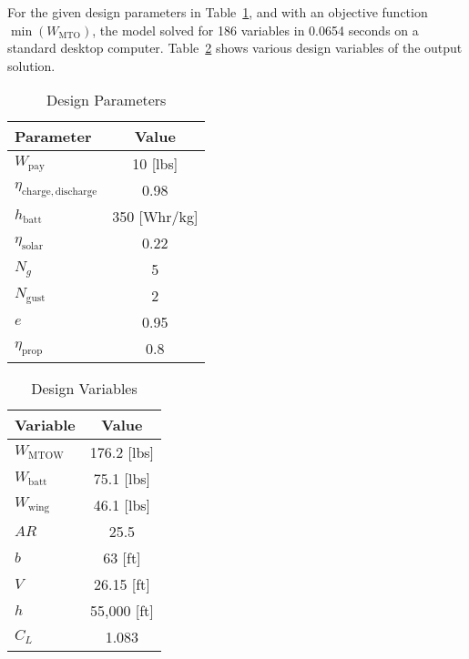 \documentclass[]{aiaa-tc}%
\begin{document}
    For the given design parameters in Table~\ref{t:params}, and with an objective function $\min(W_{\mathrm{MTO}})$, the model solved for 186 variables in 0.0654 seconds on a standard desktop computer. 
Table~\ref{t:design} shows various design variables of the output solution. 

\begin{multicols}{2}

\begin{table}[H]
    \centering
    \caption{Design Parameters}
    \label{t:params}
    \begin{tabular}{l c}
    \toprule
    \toprule
    Parameter                                   & Value \\ \hline
    $W_{\mathrm{pay}}$                          & 10 [lbs] \\
    $\eta_{\mathrm{charge, discharge}}$         & 0.98\\
    $h_{\mathrm{batt}}$                         & 350 [Whr/kg]\\
    $\eta_{\mathrm{solar}}$                     & 0.22 \\
    $N_g$                                       & 5 \\
    $N_{\mathrm{gust}}$                         & 2 \\
    $e$                                         & 0.95 \\
    $\eta_{\mathrm{prop}}$                      & 0.8  \\
    \bottomrule
\end{tabular}
\end{table}
    
\begin{table}[H]
    \centering
    \caption{Design Variables}
    \label{t:design}
    \begin{tabular}{l c}
    \toprule
    \toprule
    Variable                    & Value         \\ \hline
    $W_{\mathrm{MTOW}}$         & 176.2 [lbs]   \\
    $W_{\mathrm{batt}}$         & 75.1 [lbs]    \\
    $W_{\mathrm{wing}}$         & 46.1 [lbs]    \\
    $AR$                        & 25.5          \\
    $b$                         & 63 [ft]       \\
    $V$                         & 26.15 [ft]    \\
    $h$                         & 55,000 [ft]   \\
    $C_L$                       & 1.083         \\
    \bottomrule
\end{tabular}
\end{table}

\end{multicols}
\end{document}
